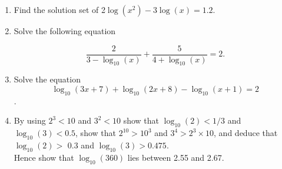 \documentclass[a4paper,12pt]{article}
\begin{document}
\begin{enumerate}

\item Find the solution set of 2$\log (x^2)- 3\log(x)  = 1.2$. 

\item Solve the following equation 

  \[\frac{2}{3 - \log_{10}(x)} + \frac{5}{4 + \log_{10}(x)} = 2.\] 


\item Solve the equation \[\log_{10} (3x + 7) + \log_{10}(2x + 8) - \log_{10}(x + 1) = 2\]. 



  \item By using $2^3 < 10$ and $3^2 < 10$ show that $\log_{10}(2) < 1/3 $ and $\log_{10}(3) < 0.5$, show that $2^{10} > 10^3$ and $3^4 > 2^3 \times 10$, and deduce that $\log_{10}(2) > $ 0.3 and $\log_{10}(3) > 0.475$. \\ Hence show that $\log_{10}(360)$ lies between 2.55 and 2.67.

\end{enumerate}
\end{document}
